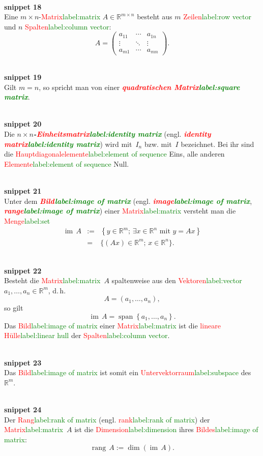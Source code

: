 \documentclass[a4paper,twoside,english,ngerman,deutsch,german,sectrefs,envcountsame,envcountchap]{svmono}
\newcommand{\setref}[2]{\textcolor{red}{#1}\textcolor{green}{#2}}
\newcommand{\snippet}[1]{\\\textbf{snippet #1}\\}
\begin{document}
\snippet{18}
Eine $m\times n$-\setref{Matrix}{label:matrix} $A\in{\mathbb{R}}^{m\times n}$ besteht aus $m$ \setref{Zeilen}{label:row vector} und $n$ \setref{Spalten}{label:column vector}:
\[
A=\left(\begin{array}{ccc} a_{11} & \cdots & a_{1n}\\
\vdots & \ddots & \vdots\\
a_{m1} & \cdots & a_{mn}
\end{array}\right).
\]

\snippet{19}
Gilt $m=n$, so spricht man von einer \textbf{\em \setref{quadratischen Matrix}{label:square matrix}}.

\snippet{20}
Die $n\times n$\textbf{\em -\setref{Einheitsmatrix}{label:identity matrix}} (engl. \textbf{\em \setref{identity matrix}{label:identity matrix}}) wird mit~$I_{n}$ bzw. mit~$I$ bezeichnet. Bei ihr sind die \setref{Hauptdiagonalelemente}{label:element of sequence} Eins, alle anderen \setref{Elemente}{label:element of sequence} Null.

\snippet{21}
Unter dem \textbf{\em \setref{Bild}{label:image of matrix}} (engl. \textbf{\em \setref{image}{label:image of matrix}}, \textbf{\em \setref{range}{label:image of matrix}}) einer \setref{Matrix}{label:matrix} versteht man die \setref{Menge}{label:set}
\[
\begin{array}{lrl}
{\operatorname{im}}\,A & := & \left\{ y\in{\mathbb{R}}^{m};\,\exists x\in{\mathbb{R}}^{n}\textrm{ mit }y=Ax\right\} \\
 & = & \{(Ax)\in{\mathbb{R}}^{m};\,x\in{\mathbb{R}}^{n}\}.
\end{array}
\]

\snippet{22}
Besteht die \setref{Matrix}{label:matrix}~$A$ spaltenweise aus den \setref{Vektoren}{label:vector} $a_{1},\ldots,a_{n}\in{\mathbb{R}}^{m}$, d.\,h.
\[
A=\left(a_{1},\ldots,a_{n}\right),
\]
so gilt
\[
{\operatorname{im}}\,A={\operatorname{span}}\left\{ a_{1},\ldots,a_{n}\right\} .
\]
Das \setref{Bild}{label:image of matrix} einer \setref{Matrix}{label:matrix} ist die \setref{lineare Hülle}{label:linear hull} der \setref{Spalten}{label:column vector}.

\snippet{23}
Das \setref{Bild}{label:image of matrix} ist somit ein \setref{Untervektorraum}{label:subspace} des~${\mathbb{R}}^{m}$.

\snippet{24}
Der \setref{Rang}{label:rank of matrix} (engl. \setref{rank}{label:rank of matrix}) der \setref{Matrix}{label:matrix}~$A$ ist die \setref{Dimension}{label:dimension} ihres \setref{Bildes}{label:image of matrix}:
\begin{equation}
{\operatorname{rang}}\,A:=\dim({\operatorname{im}}\,A).\label{eq:rank}
\end{equation}
\end{document}
